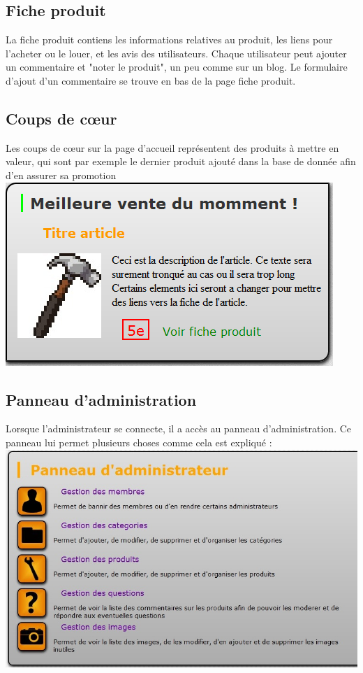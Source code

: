 	\subsection{Fiche produit}

	La fiche produit contiens les informations relatives au produit, les liens pour l'acheter ou le louer, et les avis des utilisateurs.
Chaque utilisateur peut ajouter un commentaire et "noter le produit", un peu comme sur un blog. Le formulaire d'ajout d'un commentaire se trouve en
bas de la page fiche produit. 

		
	\subsection{Coups de cœur}

	Les coups de cœur sur la page d'accueil représentent des produits à mettre en valeur, qui sont par exemple le dernier produit ajouté dans la base de donnée afin d'en assurer sa promotion
\linebreak
\includegraphics[scale=0.5]{coupcoeur.jpg}		
		
	\subsection{Panneau d'administration}

	Lorsque l'administrateur se connecte, il a accès au panneau d'administration. Ce panneau lui permet plusieurs choses comme cela est expliqué :
\linebreak
	\includegraphics[scale=0.5]{panneauadmin.jpg}